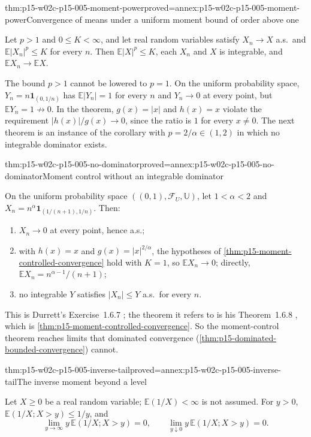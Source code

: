 \begin{hbcorollary}{thm:p15-w02c-p15-005-moment-power}{proved=annex:p15-w02c-p15-005-moment-power}{Convergence of means under a uniform moment bound of order above one}
\par\nobreak
Let \(p>1\) and \(0\leq K<\infty\), and let real random variables
satisfy \(X_n\to X\) a.s.\ and \(\mathbb E|X_n|^p\leq K\) for every
\(n\). Then \(\mathbb E|X|^p\leq K\), each \(X_n\) and \(X\) is
integrable, and \(\mathbb EX_n\to\mathbb EX\).
\end{hbcorollary}

The bound \(p>1\) cannot be lowered to \(p=1\). On the uniform
probability space, \(Y_n=n\mathbf1_{(0,1/n)}\) has
\(\mathbb E|Y_n|=1\) for every \(n\) and \(Y_n\to0\) at every point,
but \(\mathbb EY_n=1\not\to0\). In the theorem, \(g(x)=|x|\) and
\(h(x)=x\) violate the requirement \(|h(x)|/g(x)\to0\), since the ratio
is \(1\) for every \(x\neq0\). The next theorem is an instance of the
corollary with \(p=2/\alpha\in(1,2)\) in which no integrable dominator
exists.

\begin{hbtheorem}{thm:p15-w02c-p15-005-no-dominator}{proved=annex:p15-w02c-p15-005-no-dominator}{Moment control without an integrable dominator}
\par\nobreak
On the uniform probability space \(((0,1),\mathcal F_U,\mathbb U)\),
let \(1<\alpha<2\) and
\(X_n=n^\alpha\mathbf1_{(1/(n+1),1/n)}\). Then:
\begin{enumerate}
\item \(X_n\to0\) at every point, hence a.s.;
\item with \(h(x)=x\) and \(g(x)=|x|^{2/\alpha}\), the hypotheses of
      \cref{thm:p15-moment-controlled-convergence} hold with \(K=1\),
      so \(\mathbb EX_n\to0\); directly,
      \(\mathbb EX_n=n^{\alpha-1}/(n+1)\);
\item no integrable \(Y\) satisfies \(|X_n|\leq Y\) a.s.\ for every
      \(n\).
\end{enumerate}
\end{hbtheorem}

This is Durrett's Exercise~1.6.7 \cite[p.~36]{DurrettPTEAuthor2019};
the theorem it refers to is his Theorem~1.6.8
\cite[p.~31]{DurrettPTEAuthor2019}, which is
\cref{thm:p15-moment-controlled-convergence}. So the moment-control
theorem reaches limits that dominated convergence
(\cref{thm:p15-dominated-bounded-convergence}) cannot.

\begin{hbtheorem}{thm:p15-w02c-p15-005-inverse-tail}{proved=annex:p15-w02c-p15-005-inverse-tail}{The inverse moment beyond a level}
\par\nobreak
Let \(X\geq0\) be a real random variable; \(\mathbb E(1/X)<\infty\)
is not assumed. For \(y>0\), \(\mathbb E(1/X;X>y)\leq1/y\), and
\[
 \lim_{y\to\infty}y\,\mathbb E(1/X;X>y)=0,
 \qquad
 \lim_{y\downarrow0}y\,\mathbb E(1/X;X>y)=0 .
\]
\end{hbtheorem}

